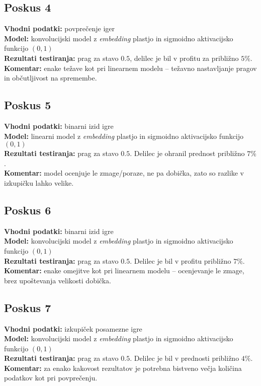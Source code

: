 \documentclass[a4paper,12pt]{article}
\begin{document}
\subsection{Poskus 4}
\textbf{Vhodni podatki:} povprečenje iger \\
\textbf{Model:} konvolucijski model z \textit{embedding} plastjo in sigmoidno aktivacijsko funkcijo $(0,1)$ \\
\textbf{Rezultati testiranja:} prag za stavo $0.5$, delilec je bil v profitu za približno $5\%$. \\
\textbf{Komentar:} enake težave kot pri linearnem modelu – težavno nastavljanje pragov in občutljivost na spremembe.

\subsection{Poskus 5}
\textbf{Vhodni podatki:} binarni izid igre \\
\textbf{Model:} linearni model z \textit{embedding} plastjo in sigmoidno aktivacijsko funkcijo $(0,1)$ \\
\textbf{Rezultati testiranja:} prag za stavo $0.5$. Delilec je ohranil prednost približno $7\%$. \\
\textbf{Komentar:} model ocenjuje le zmage/poraze, ne pa dobička, zato so razlike v izkupičku lahko velike.

\subsection{Poskus 6}
\textbf{Vhodni podatki:} binarni izid igre \\
\textbf{Model:} konvolucijski model z \textit{embedding} plastjo in sigmoidno aktivacijsko funkcijo $(0,1)$ \\
\textbf{Rezultati testiranja:} prag za stavo $0.5$. Delilec je bil v profitu približno $7\%$. \\
\textbf{Komentar:} enake omejitve kot pri linearnem modelu – ocenjevanje le zmage, brez upoštevanja velikosti dobička.

\subsection{Poskus 7}
\textbf{Vhodni podatki:} izkupiček posamezne igre \\
\textbf{Model:} konvolucijski model z \textit{embedding} plastjo in sigmoidno aktivacijsko funkcijo $(0,1)$ \\
\textbf{Rezultati testiranja:} prag za stavo $0.5$. Delilec je bil v prednosti približno $4\%$. \\
\textbf{Komentar:} za enako kakovost rezultatov je potrebna bistveno večja količina podatkov kot pri povprečenju.
\end{document}
